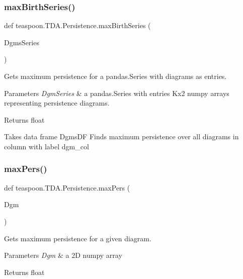\subsubsection{\texorpdfstring{max\+Birth\+Series()}{maxBirthSeries()}}
{\footnotesize\ttfamily def teaspoon.\+T\+D\+A.\+Persistence.\+max\+Birth\+Series (\begin{DoxyParamCaption}\item[{}]{Dgms\+Series }\end{DoxyParamCaption})}



Gets maximum persistence for a pandas.\+Series with diagrams as entries.


\begin{DoxyParams}{Parameters}
{\em Dgm\+Series} & a pandas.\+Series with entries Kx2 numpy arrays representing persistence diagrams.\\
\hline
\end{DoxyParams}
\begin{DoxyReturn}{Returns}
float \begin{DoxyVerb}Takes data frame DgmsDF
Finds maximum persistence over all diagrams in
column with label dgm_col
\end{DoxyVerb}

\end{DoxyReturn}
\mbox{\label{namespaceteaspoon_1_1_t_d_a_1_1_persistence_aff5b752e3141736e91e1386d28b3dfd5}}
\subsubsection{\texorpdfstring{max\+Pers()}{maxPers()}}
{\footnotesize\ttfamily def teaspoon.\+T\+D\+A.\+Persistence.\+max\+Pers (\begin{DoxyParamCaption}\item[{}]{Dgm }\end{DoxyParamCaption})}



Gets maximum persistence for a given diagram.


\begin{DoxyParams}{Parameters}
{\em Dgm} & a 2D numpy array\\
\hline
\end{DoxyParams}
\begin{DoxyReturn}{Returns}
float
\end{DoxyReturn}
\mbox{\label{namespaceteaspoon_1_1_t_d_a_1_1_persistence_a6413fcc8a65a5422547f264331eb5c7d}}
